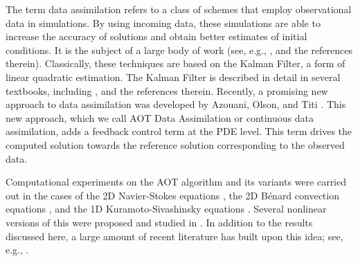\documentclass[12pt]{amsart}
\theoremstyle{plain}
\theoremstyle{definition}
\theoremstyle{remark}
\numberwithin{equation}{section} %
\numberwithin{figure}{section}   %
\begin{document}
The term data assimilation refers to a class of schemes that employ observational data in simulations. By using incoming data, these simulations are able to increase the accuracy of solutions and obtain better estimates of initial conditions.
It is the subject of a large body of work (see, e.g., \cite{Daley_1993_atmospheric_book,Kalnay_2003_DA_book,Law_Stuart_Zygalakis_2015_book}, and the references therein).  
Classically, these techniques are based on the Kalman Filter, a form of linear quadratic estimation.  The Kalman Filter is described in detail in several textbooks, including \cite{Daley_1993_atmospheric_book,Kalnay_2003_DA_book,Law_Stuart_Zygalakis_2015_book,CHJ69}, and the references therein.  Recently, a promising new approach to data assimilation was  developed by Azouani, Olson, and Titi \cite{Azouani_Olson_Titi_2014,Azouani_Titi_2014}. 
This new approach, which we call AOT Data Assimilation or continuous data assimilation, adds a feedback control term at the PDE level. This term drives the computed solution towards the reference solution corresponding to the observed data. 

Computational experiments on the AOT algorithm and its variants were carried out in the cases of the 2D Navier-Stokes equations \cite{Gesho_Olson_Titi_2015}, the 2D B\'enard convection equations \cite{Altaf_Titi_Knio_Zhao_Mc_Cabe_Hoteit_2015}, and the 1D Kuramoto-Sivashinsky equations \cite{Lunasin_Titi_2015,Larios_Pei_2017_KSE_DA_NL}. Several nonlinear versions of this were proposed and studied in \cite{Larios_Pei_2017_KSE_DA_NL}. In addition to the results discussed here, a large amount of recent literature has built upon this idea; see, e.g., \cite{Albanez_Nussenzveig_Lopes_Titi_2016,Biswas_Martinez_2017,Farhat_Jolly_Titi_2015,Farhat_Lunasin_Titi_2016abridged,Farhat_Lunasin_Titi_2016benard,Farhat_Lunasin_Titi_2016_Charney,Farhat_Lunasin_Titi_2017_Horizontal,Foyash_Dzholli_Kravchenko_Titi_2014,GlattHoltz_Kukavica_Vicol_2014,Jolly_Martinez_Titi_2017,Jolly_Sadigov_Titi_2015,Larios_Lunasin_Titi_2015,Markowich_Titi_Trabelsi_2016,Mondaini_Titi_2017,Mondaini_Titi_2018_SIAM_NA}.
\end{document}
